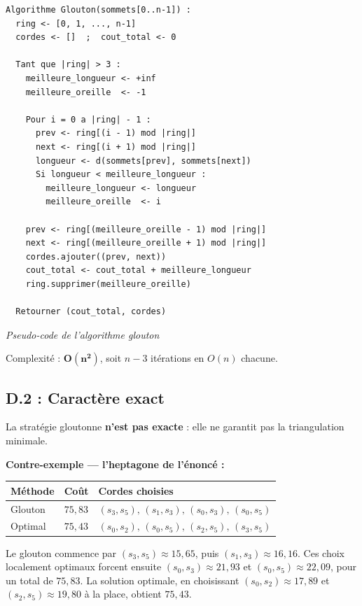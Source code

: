 \documentclass[12pt,a4paper]{article}
\begin{document}
\begin{lstlisting}[nolol]
Algorithme Glouton(sommets[0..n-1]) :
  ring <- [0, 1, ..., n-1]
  cordes <- []  ;  cout_total <- 0

  Tant que |ring| > 3 :
    meilleure_longueur <- +inf
    meilleure_oreille  <- -1

    Pour i = 0 a |ring| - 1 :
      prev <- ring[(i - 1) mod |ring|]
      next <- ring[(i + 1) mod |ring|]
      longueur <- d(sommets[prev], sommets[next])
      Si longueur < meilleure_longueur :
        meilleure_longueur <- longueur
        meilleure_oreille  <- i

    prev <- ring[(meilleure_oreille - 1) mod |ring|]
    next <- ring[(meilleure_oreille + 1) mod |ring|]
    cordes.ajouter((prev, next))
    cout_total <- cout_total + meilleure_longueur
    ring.supprimer(meilleure_oreille)

  Retourner (cout_total, cordes)
\end{lstlisting}
\begin{center}
{\small\itshape Pseudo-code de l'algorithme glouton}
\end{center}

Complexité : $\mathbf{O(n^2)}$, soit $n-3$ itérations en $O(n)$ chacune.

\subsection{D.2 : Caractère exact}

La stratégie gloutonne \textbf{n'est pas exacte} : elle ne garantit pas la triangulation
minimale.

\textbf{Contre-exemple --- l'heptagone de l'énoncé :}

\begin{center}
\begin{tabular}{lll}
\toprule
Méthode & Coût & Cordes choisies \\
\midrule
Glouton & $75{,}83$ & $(s_3,s_5),\,(s_1,s_3),\,(s_0,s_3),\,(s_0,s_5)$ \\
Optimal & $75{,}43$ & $(s_0,s_2),\,(s_0,s_5),\,(s_2,s_5),\,(s_3,s_5)$ \\
\bottomrule
\end{tabular}
\end{center}

Le glouton commence par $(s_3,s_5) \approx 15{,}65$, puis $(s_1,s_3) \approx 16{,}16$.
Ces choix localement optimaux forcent ensuite $(s_0,s_3) \approx 21{,}93$ et
$(s_0,s_5) \approx 22{,}09$, pour un total de $75{,}83$. La solution optimale, en
choisissant $(s_0,s_2) \approx 17{,}89$ et $(s_2,s_5) \approx 19{,}80$ à la place, obtient
$75{,}43$.
\end{document}
